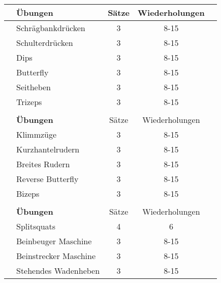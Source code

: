 \documentclass{article}
\begin{document}
\begin{table}[ht]
\begin{tabular}{c|lccc}
    \rowcolor[HTML]{FFCE93} & \textbf{Übungen}             & Sätze     & Wiederholungen & \\ \hline
    \rowcolor[HTML]{EFEFEF} & Schrägbankdrücken            & 3         & 8-15           & \\
    \rowcolor[HTML]{FFFFFF} & Schulterdrücken              & 3         & 8-15           & \\
    \rowcolor[HTML]{EFEFEF} & Dips                         & 3         & 8-15           & \\
    \rowcolor[HTML]{FFFFFF} & Butterfly                    & 3         & 8-15           & \\
    \rowcolor[HTML]{EFEFEF} & Seitheben                    & 3         & 8-15           & \\
    \rowcolor[HTML]{FFFFFF} & Trizeps                      & 3         & 8-15           & \\ \hline
                            &                              &           &                & \\
    \rowcolor[HTML]{FFCE93} & \textbf{Übungen}             & Sätze     & Wiederholungen & \\ \hline
    \rowcolor[HTML]{EFEFEF} & Klimmzüge                    & 3         & 8-15           & \\
    \rowcolor[HTML]{FFFFFF} & Kurzhantelrudern             & 3         & 8-15           & \\
    \rowcolor[HTML]{EFEFEF} & Breites Rudern               & 3         & 8-15           & \\
    \rowcolor[HTML]{FFFFFF} & Reverse Butterfly            & 3         & 8-15           & \\
    \rowcolor[HTML]{FFFFFF} & Bizeps                       & 3         & 8-15           & \\ \hline
                            &                              &           &                & \\
    \rowcolor[HTML]{FFCE93} & \textbf{Übungen}             & Sätze     & Wiederholungen & \\ \hline
    \rowcolor[HTML]{EFEFEF} & Splitsquats                    & 4         & 6              & \\
    \rowcolor[HTML]{EFEFEF} & Beinbeuger Maschine          & 3         & 8-15           & \\
    \rowcolor[HTML]{FFFFFF} & Beinstrecker Maschine                & 3         & 8-15           & \\
    \rowcolor[HTML]{FFFFFF} & Stehendes Wadenheben         & 3         & 8-15           & \\ \hline
  \end{tabular}

\end{table}
\end{document}
